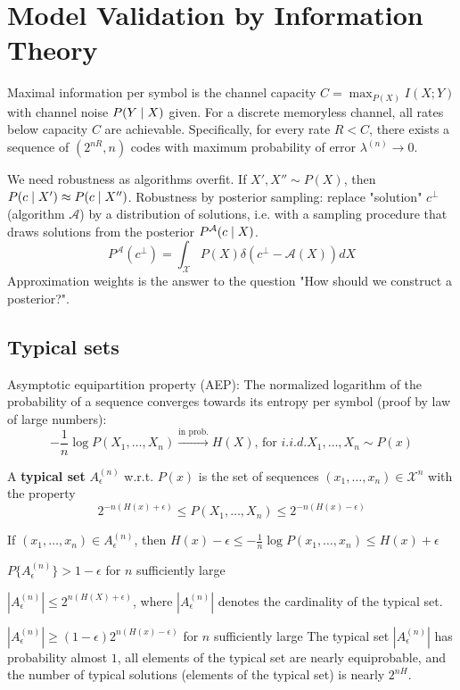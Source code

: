 \documentclass[12pt]{article}
\begin{document}
\section{Model Validation by Information Theory}
\par Maximal information per symbol is the channel capacity $C = \max_{P(X)} I(X;Y)$ with channel noise $P(Y\mid X)$ given. For a discrete memoryless channel, all rates below capacity $C$ are achievable. Specifically, for every rate $R<C$, there exists a sequence of $(2^{nR},n)$ codes with maximum probability of error $\lambda^{(n)}\rightarrow 0$.
\par We need robustness as algorithms overfit. If $X',X''\sim P(X)$, then $P(c\mid X')\approx P(c\mid X'')$. Robustness by posterior sampling: replace "solution" $c^{\bot}$ (algorithm $\mathcal{A}$) by a distribution of solutions, i.e. with a sampling procedure that draws solutions from the posterior $P^{\mathcal{A}}(c\mid X)$.
\[ P^{\mathcal{A}}(c^{\bot}) = \int_{\mathcal{X}}P(X)\delta(c^{\bot} - \mathcal{A}(X))dX \]
Approximation weights is the answer to the question "How should we construct a posterior?".

\subsection{Typical sets}
\par Asymptotic equipartition property (AEP): The normalized logarithm of the probability of a sequence converges towards its entropy per symbol (proof by law of large numbers):
\[ -\frac{1}{n}\log P(X_1,\dots,X_n) \stackrel{\text{in prob.}}{\rightarrow} H(X) \text{, for } i.i.d. X_1,\dots,X_n \sim P(x) \]
\par A \textbf{typical set} $A_{\epsilon}^{(n)}$ w.r.t. $P(x)$ is the set of sequences $(x_1, \dots, x_n) \in \mathcal{X}^n$ with the property
\[ 2^{-n(H(x)+\epsilon)} \leq P(X_1,\dots,X_n) \leq 2^{-n(H(x)-\epsilon)} \]
\ulb
\item If $(x_1, \dots, x_n)\in A_{\epsilon}^{(n)}$, then $H(x)-\epsilon \leq -\frac{1}{n}\log P(x_1, \dots, x_n) \leq H(x) + \epsilon$
\item $P\{A_{\epsilon}^{(n)}\} > 1-\epsilon$ for $n$ sufficiently large
\item $|A_{\epsilon}^{(n)}| \leq 2^{n(H(X)+\epsilon)}$, where $|A_{\epsilon}^{(n)}|$ denotes the cardinality of the typical set.
\item $|A_{\epsilon}^{(n)}|\geq (1-\epsilon) 2^{n(H(x)-\epsilon)}$ for $n$ sufficiently large
\ule
The typical set $|A_{\epsilon}^{(n)}|$ has probability almost $1$, all elements of the typical set are nearly equiprobable, and the number of typical solutions (elements of the typical set) is nearly $2^{nH}$.
\end{document}
